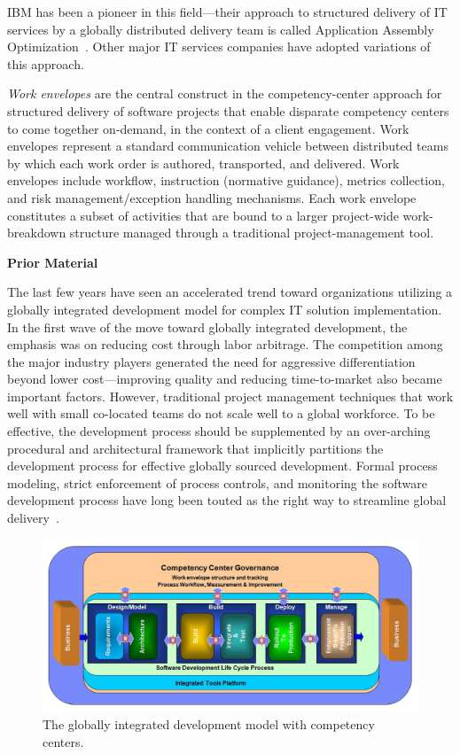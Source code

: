 IBM has been a pioneer in
this field---their approach to structured delivery of IT services by a globally
distributed delivery team is called Application Assembly
Optimization~\cite{gloaao}. Other major IT services companies have adopted
variations of this approach.

\textit{Work envelopes} are the central construct in the competency-center approach for
structured delivery of software projects that enable disparate competency
centers to come together on-demand, in the context of a client engagement.  Work
envelopes represent a standard communication vehicle between distributed teams
by which each work order is authored, transported, and delivered. Work envelopes
include workflow, instruction (normative guidance), metrics collection, and risk
management/exception handling mechanisms. Each work envelope constitutes a
subset of activities that are bound to a larger project-wide work-breakdown
structure managed through a traditional project-management tool. 



\textbf{Prior Material}

The last few years have seen an accelerated trend toward organizations utilizing
a globally integrated development model for complex IT solution
implementation. In the first wave of the move toward globally integrated
development, the emphasis was on reducing cost through labor arbitrage.  The
competition among the major industry players generated the need for aggressive
differentiation beyond lower cost---improving quality and reducing
time-to-market also became important factors. However, traditional project
management techniques that work well with small co-located teams do not scale
well to a global workforce.  To be effective, the development process should be
supplemented by an over-arching procedural and architectural framework that
implicitly partitions the development process for effective globally sourced
development. Formal process modeling, strict enforcement of process controls,
and monitoring the software development process have long been touted as the
right way to streamline global delivery~\cite{glo32}.

\begin{figure}[t]
\centering
\includegraphics[bb= 28 0 740 355, scale=0.32]{figs/glocomp.jpg}
\vspace*{-13pt}
\caption{The globally integrated development model with competency centers.}
\vspace*{-16pt}
\label{glofig1}
\end{figure}

